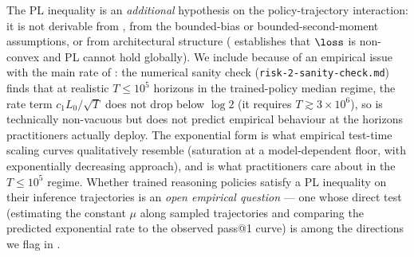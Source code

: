 \begin{remark}\label{rem:pl_assumption_honesty}
The PL inequality  is an \emph{additional}
hypothesis on the policy-trajectory interaction: it is not derivable
from , from the bounded-bias
or bounded-second-moment assumptions, or from architectural structure
( establishes that $\loss$ is non-convex
and PL cannot hold globally). We include 
because of an empirical issue with the main rate of
: the numerical sanity check
(\texttt{risk-2-sanity-check.md}) finds that at realistic
$T \le 10^5$ horizons in the trained-policy median regime, the rate
term $c_1 L_0 / \sqrt T$ does not drop below $\log 2$ (it requires
$T \gtrsim 3 \times 10^6$), so  is
technically non-vacuous but does not predict empirical behaviour at the
horizons practitioners actually deploy. The exponential form
 is what empirical test-time scaling curves
qualitatively resemble (saturation at a model-dependent floor, with
exponentially decreasing approach), and is what practitioners care about
in the $T \le 10^5$ regime. Whether trained reasoning policies satisfy a
PL inequality on their inference trajectories is an \emph{open empirical
question} --- one whose direct test (estimating the constant $\mu$ along
sampled trajectories and comparing the predicted exponential rate to
the observed pass@1 curve) is among the directions we flag in
.
\end{remark}
